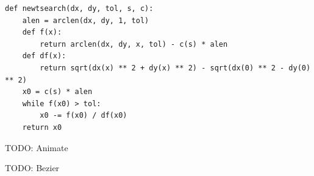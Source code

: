 \documentclass{article}
\begin{document}
\begin{verbatim}
def newtsearch(dx, dy, tol, s, c):
    alen = arclen(dx, dy, 1, tol)
    def f(x):
        return arclen(dx, dy, x, tol) - c(s) * alen
    def df(x):
        return sqrt(dx(x) ** 2 + dy(x) ** 2) - sqrt(dx(0) ** 2 - dy(0) ** 2)
    x0 = c(s) * alen
    while f(x0) > tol:
        x0 -= f(x0) / df(x0)
    return x0
\end{verbatim}

\vspace*{0.5cm}

TODO: Animate

TODO: Bezier
\end{document}
